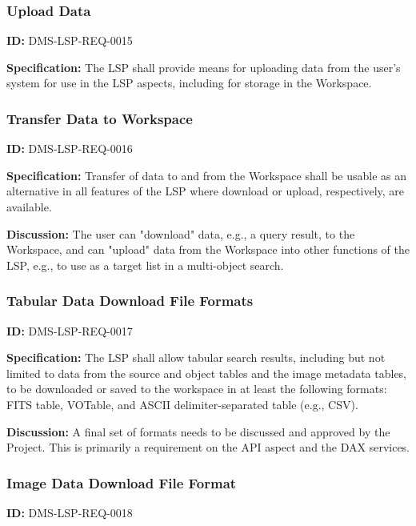 \documentclass[SE,toc]{lsstdoc}
\begin{document}
\subsubsection{Upload Data}

\label{DMS-LSP-REQ-0015}
\textbf{ID:} DMS-LSP-REQ-0015

\textbf{Specification:}
The LSP shall provide means for uploading data from the user's system for use in the LSP aspects, including for storage in the Workspace.

\subsubsection{Transfer Data to Workspace}

\label{DMS-LSP-REQ-0016}
\textbf{ID:} DMS-LSP-REQ-0016

\textbf{Specification:}
Transfer of data to and from the Workspace shall be usable as an alternative in all features of the LSP where download or upload, respectively, are available.

\textbf{Discussion:}
The user can "download" data, e.g., a query result, to the Workspace, and can "upload" data from the Workspace into other functions of the LSP, e.g., to use as a target list in a multi-object search.

\subsubsection{Tabular Data Download File Formats}

\label{DMS-LSP-REQ-0017}
\textbf{ID:} DMS-LSP-REQ-0017

\textbf{Specification:}
The LSP shall allow tabular search results, including but not limited to data from the source and object tables and the image metadata tables, to be downloaded or saved to the workspace in at least the following formats: FITS table, VOTable, and ASCII delimiter-separated table (e.g., CSV).

\textbf{Discussion:}
A final set of formats needs to be discussed and approved by the Project.
This is primarily a requirement on the API aspect and the DAX services.

\subsubsection{Image Data Download File Format}

\label{DMS-LSP-REQ-0018}
\textbf{ID:} DMS-LSP-REQ-0018
\end{document}
